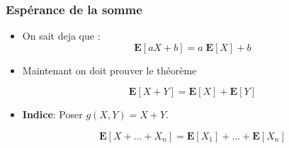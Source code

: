 \documentclass{beamer}
\newcommand{\E}{\mathbf{E}}
\begin{document}
\begin{frame}[t]
  \frametitle{Espérance de la somme}
  \begin{itemize}
    \small
    \item On sait deja que :
      $$
      \E[aX + b] = a\;\E[X]  + b
      $$
      \pause
    \item Maintenant on doit prouver le théorème\vspace*{.4cm}
      \begin{minipage}{.8\textwidth}
         \centering
         \begin{tcolorbox}
          $$
          \E[X + Y] = \E[X] + \E[Y]
          $$
         \end{tcolorbox}
      \end{minipage}
  \end{itemize}
  
  \begin{itemize}
    \item \alert{\textbf{Indice}}: Poser $g(X,Y) = X + Y$.

      \pause
      \vspace*{.5cm}
      \begin{minipage}{.8\textwidth}
         \centering
         \begin{tcolorbox}
          $$
          \E[X + \ldots  + X_n] = \E[X_1] + \ldots + \E[X_n]
          $$
         \end{tcolorbox}
      \end{minipage}
  \end{itemize}
\end{frame}
\end{document}
